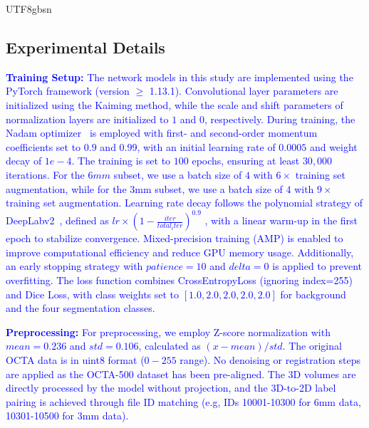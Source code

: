 \documentclass[times, review, 10pt]{elsarticle}
\begin{document}
\begin{CJK}{UTF8}{gbsn}
\subsection{Experimental Details}
\textcolor{blue}{\textbf{Training Setup:} The network models in this study are implemented using the PyTorch framework (version $\geq$ 1.13.1). Convolutional layer parameters are initialized using the Kaiming method, while the scale and shift parameters of normalization layers are initialized to $1$ and $0$, respectively. During training, the Nadam optimizer~\cite{ref51} is employed with first- and second-order momentum coefficients set to $0.9$ and $0.99$, with an initial learning rate of $0.0005$ and weight decay of $1e-4$. The training is set to $100$ epochs, ensuring at least $30,000$ iterations. For the $6mm$ subset, we use a batch size of $4$ with $6×$ training set augmentation, while for the 3mm subset, we use a batch size of $4$ with $9×$ training set augmentation. Learning rate decay follows the polynomial strategy of DeepLabv2~\cite{ref52}, defined as $ lr \times (1 - \frac{iter}{total_iter})^{0.9} $ , with a linear warm-up in the first epoch to stabilize convergence. Mixed-precision training (AMP) is enabled to improve computational efficiency and reduce GPU memory usage. Additionally, an early stopping strategy with $patience=10$ and $delta=0$ is applied to prevent overfitting. The loss function combines CrossEntropyLoss (ignoring index=255) and Dice Loss, with class weights set to $[1.0, 2.0, 2.0, 2.0, 2.0]$ for background and the four segmentation classes.}
\par
\textcolor{blue}{\textbf{Preprocessing:} For preprocessing, we employ Z-score normalization with $mean=0.236$ and $std=0.106$, calculated as $(x - mean) / std$. The original OCTA data is in uint8 format ($0-255$ range). No denoising or registration steps are applied as the OCTA-500 dataset has been pre-aligned. The 3D volumes are directly processed by the model without projection, and the 3D-to-2D label pairing is achieved through file ID matching (e.g, IDs 10001-10300 for 6mm data, 10301-10500 for 3mm data).}


\end{CJK}
\end{document}
